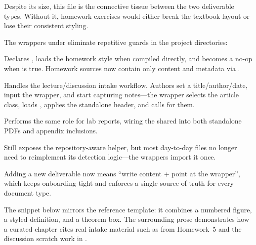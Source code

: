 Despite its size, this file is the connective tissue between the two deliverable
types. Without it, homework exercises would either break the textbook layout or
lose their consistent styling.

\label{sec:system-wrappers}

The wrappers under  eliminate repetitive guards in the
project directories:
\begin{description}[leftmargin=2.6em,labelwidth=2.4em]
  \item[\textbf{document-homework.tex}] Declares
        \InlineCode{\HomeworkDocumentBegin/\HomeworkDocumentEnd},
        loads the homework style when compiled directly, and becomes a no-op
        when \InlineMacro{\ifMathHomeworkEmbedded} is true. Homework sources now
        contain only content and metadata via \InlineMacro{\HomeworkSetup}.
  \item[\textbf{document-notes.tex}] Handles the lecture/discussion intake
        workflow. Authors set a title/author/date, input the wrapper, and start
        capturing notes—the wrapper selects the article class, loads
        , applies the standalone header, and
        calls \InlineMacro{\MathNotesDocumentEnd} for them.
  \item[\textbf{document-report.tex}] Performs the same role for lab reports,
        wiring the shared  into both
        standalone PDFs and appendix inclusions.
  \item[\textbf{bootstrap.tex}] Still exposes the repository-aware
        \InlineMacro{\TexInput} helper, but most day-to-day files no longer need
        to reimplement its detection logic—the wrappers import it once.
\end{description}

Adding a new deliverable now means ``write content + point at the wrapper'',
which keeps onboarding tight and enforces a single source of truth for every
document type.

\label{sec:notes-usage-examples}

The snippet below mirrors the reference template: it combines a numbered figure,
a styled definition, and a theorem box. The surrounding prose demonstrates how a
curated chapter cites real intake material such as  from
Homework~5 and the discussion scratch work in .

